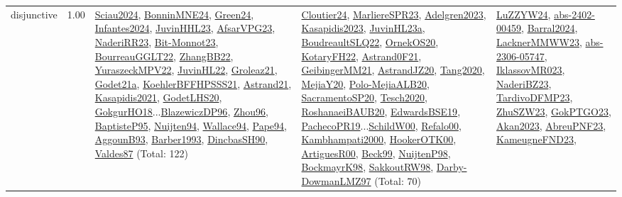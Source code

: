 {\begin{longtable}{p{3cm}r>{\raggedright\arraybackslash}p{6cm}>{\raggedright\arraybackslash}p{6cm}>{\raggedright\arraybackslash}p{8cm}}
\index{disjunctive}\index{Constraints!disjunctive}disjunctive &  1.00 & \hyperref[detail:Sciau2024]{Sciau2024}, \hyperref[detail:BonninMNE24]{BonninMNE24}, \hyperref[detail:Green24]{Green24}, \hyperref[detail:Infantes2024]{Infantes2024}, \hyperref[detail:JuvinHHL23]{JuvinHHL23}, \hyperref[detail:AfsarVPG23]{AfsarVPG23}, \hyperref[detail:NaderiRR23]{NaderiRR23}, \hyperref[detail:Bit-Monnot23]{Bit-Monnot23}, \hyperref[detail:BourreauGGLT22]{BourreauGGLT22}, \hyperref[detail:ZhangBB22]{ZhangBB22}, \hyperref[detail:YuraszeckMPV22]{YuraszeckMPV22}, \hyperref[detail:JuvinHL22]{JuvinHL22}, \hyperref[detail:Groleaz21]{Groleaz21}, \hyperref[detail:Godet21a]{Godet21a}, \hyperref[detail:KoehlerBFFHPSSS21]{KoehlerBFFHPSSS21}, \hyperref[detail:Astrand21]{Astrand21}, \hyperref[detail:Kasapidis2021]{Kasapidis2021}, \hyperref[detail:GodetLHS20]{GodetLHS20}, \hyperref[detail:GokgurHO18]{GokgurHO18}...\hyperref[detail:BlazewiczDP96]{BlazewiczDP96}, \hyperref[detail:Zhou96]{Zhou96}, \hyperref[detail:BaptisteP95]{BaptisteP95}, \hyperref[detail:Nuijten94]{Nuijten94}, \hyperref[detail:Wallace94]{Wallace94}, \hyperref[detail:Pape94]{Pape94}, \hyperref[detail:AggounB93]{AggounB93}, \hyperref[detail:Barber1993]{Barber1993}, \hyperref[detail:DincbasSH90]{DincbasSH90}, \hyperref[detail:Valdes87]{Valdes87} (Total: 122) & \hyperref[detail:Cloutier24]{Cloutier24}, \hyperref[detail:MarliereSPR23]{MarliereSPR23}, \hyperref[detail:Adelgren2023]{Adelgren2023}, \hyperref[detail:Kasapidis2023]{Kasapidis2023}, \hyperref[detail:JuvinHL23a]{JuvinHL23a}, \hyperref[detail:BoudreaultSLQ22]{BoudreaultSLQ22}, \hyperref[detail:OrnekOS20]{OrnekOS20}, \hyperref[detail:KotaryFH22]{KotaryFH22}, \hyperref[detail:Astrand0F21]{Astrand0F21}, \hyperref[detail:GeibingerMM21]{GeibingerMM21}, \hyperref[detail:AstrandJZ20]{AstrandJZ20}, \hyperref[detail:Tang2020]{Tang2020}, \hyperref[detail:MejiaY20]{MejiaY20}, \hyperref[detail:Polo-MejiaALB20]{Polo-MejiaALB20}, \hyperref[detail:SacramentoSP20]{SacramentoSP20}, \hyperref[detail:Tesch2020]{Tesch2020}, \hyperref[detail:RoshanaeiBAUB20]{RoshanaeiBAUB20}, \hyperref[detail:EdwardsBSE19]{EdwardsBSE19}, \hyperref[detail:PachecoPR19]{PachecoPR19}...\hyperref[detail:SchildW00]{SchildW00}, \hyperref[detail:Refalo00]{Refalo00}, \hyperref[detail:Kambhampati2000]{Kambhampati2000}, \hyperref[detail:HookerOTK00]{HookerOTK00}, \hyperref[detail:ArtiguesR00]{ArtiguesR00}, \hyperref[detail:Beck99]{Beck99}, \hyperref[detail:NuijtenP98]{NuijtenP98}, \hyperref[detail:BockmayrK98]{BockmayrK98}, \hyperref[detail:SakkoutRW98]{SakkoutRW98}, \hyperref[detail:Darby-DowmanLMZ97]{Darby-DowmanLMZ97} (Total: 70) & \hyperref[detail:LuZZYW24]{LuZZYW24}, \hyperref[detail:abs-2402-00459]{abs-2402-00459}, \hyperref[detail:Barral2024]{Barral2024}, \hyperref[detail:LacknerMMWW23]{LacknerMMWW23}, \hyperref[detail:abs-2306-05747]{abs-2306-05747}, \hyperref[detail:IklassovMR023]{IklassovMR023}, \hyperref[detail:NaderiBZ23]{NaderiBZ23}, \hyperref[detail:TardivoDFMP23]{TardivoDFMP23}, \hyperref[detail:ZhuSZW23]{ZhuSZW23}, \hyperref[detail:GokPTGO23]{GokPTGO23}, \hyperref[detail:Akan2023]{Akan2023}, \hyperref[detail:AbreuPNF23]{AbreuPNF23}, \hyperref[detail:KameugneFND23]{KameugneFND23}, 
\end{longtable}}
